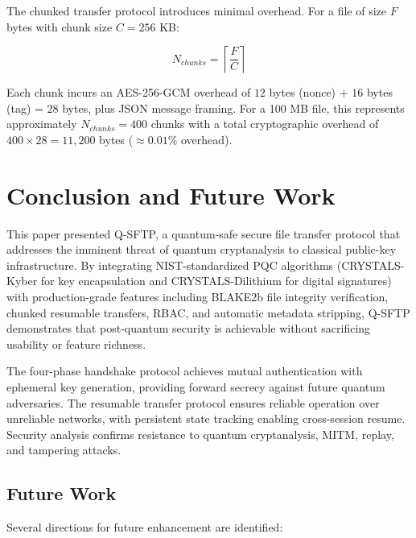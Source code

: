 \documentclass[12pt, a4paper]{article}
\begin{document}
The chunked transfer protocol introduces minimal overhead. For a file of size $F$ bytes with chunk size $C = 256$ KB:

\begin{equation}
    N_{chunks} = \left\lceil \frac{F}{C} \right\rceil
\end{equation}

Each chunk incurs an AES-256-GCM overhead of $12$ bytes (nonce) + $16$ bytes (tag) = $28$ bytes, plus JSON message framing. For a 100 MB file, this represents approximately $N_{chunks} = 400$ chunks with a total cryptographic overhead of $400 \times 28 = 11,200$ bytes ($\approx 0.01\%$ overhead).

\section{Conclusion and Future Work}
\label{sec:conclusion}

This paper presented Q-SFTP, a quantum-safe secure file transfer protocol that addresses the imminent threat of quantum cryptanalysis to classical public-key infrastructure. By integrating NIST-standardized PQC algorithms (CRYSTALS-Kyber for key encapsulation and CRYSTALS-Dilithium for digital signatures) with production-grade features including BLAKE2b file integrity verification, chunked resumable transfers, RBAC, and automatic metadata stripping, Q-SFTP demonstrates that post-quantum security is achievable without sacrificing usability or feature richness.

The four-phase handshake protocol achieves mutual authentication with ephemeral key generation, providing forward secrecy against future quantum adversaries. The resumable transfer protocol ensures reliable operation over unreliable networks, with persistent state tracking enabling cross-session resume. Security analysis confirms resistance to quantum cryptanalysis, MITM, replay, and tampering attacks.

\subsection{Future Work}

Several directions for future enhancement are identified:
\end{document}
